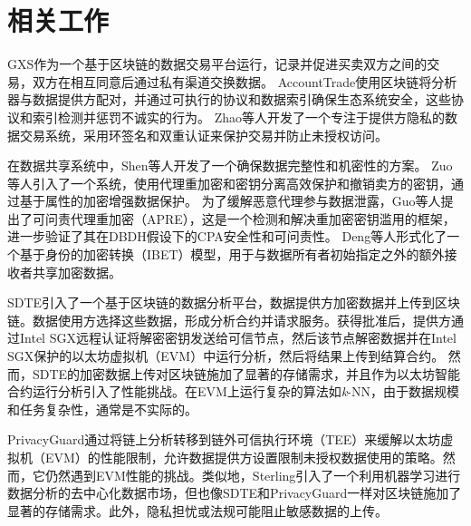 \section{相关工作}
GXS作为一个基于区块链的数据交易平台运行，记录并促进买卖双方之间的交易，双方在相互同意后通过私有渠道交换数据。
AccountTrade使用区块链将分析器与数据提供方配对，并通过可执行的协议和数据索引确保生态系统安全，这些协议和索引检测并惩罚不诚实的行为。
Zhao等人开发了一个专注于提供方隐私的数据交易系统，采用环签名和双重认证来保护交易并防止未授权访问。

在数据共享系统中，Shen等人开发了一个确保数据完整性和机密性的方案。
Zuo等人引入了一个系统，使用代理重加密和密钥分离高效保护和撤销卖方的密钥，通过基于属性的加密增强数据保护。
为了缓解恶意代理参与数据泄露，Guo等人提出了可问责代理重加密（APRE），这是一个检测和解决重加密密钥滥用的框架，进一步验证了其在DBDH假设下的CPA安全性和可问责性。
Deng等人形式化了一个基于身份的加密转换（IBET）模型，用于与数据所有者初始指定之外的额外接收者共享加密数据。

SDTE引入了一个基于区块链的数据分析平台，数据提供方加密数据并上传到区块链。数据使用方选择这些数据，形成分析合约并请求服务。获得批准后，提供方通过Intel SGX远程认证将解密密钥发送给可信节点，然后该节点解密数据并在Intel SGX保护的以太坊虚拟机（EVM）中运行分析，然后将结果上传到结算合约。
然而，SDTE的加密数据上传对区块链施加了显著的存储需求，并且作为以太坊智能合约运行分析引入了性能挑战。在EVM上运行复杂的算法如\textit{k}-NN，由于数据规模和任务复杂性，通常是不实际的。

PrivacyGuard通过将链上分析转移到链外可信执行环境（TEE）来缓解以太坊虚拟机（EVM）的性能限制，允许数据提供方设置限制未授权数据使用的策略。然而，它仍然遇到EVM性能的挑战。类似地，Sterling引入了一个利用机器学习进行数据分析的去中心化数据市场，但也像SDTE和PrivacyGuard一样对区块链施加了显著的存储需求。此外，隐私担忧或法规可能阻止敏感数据的上传。 